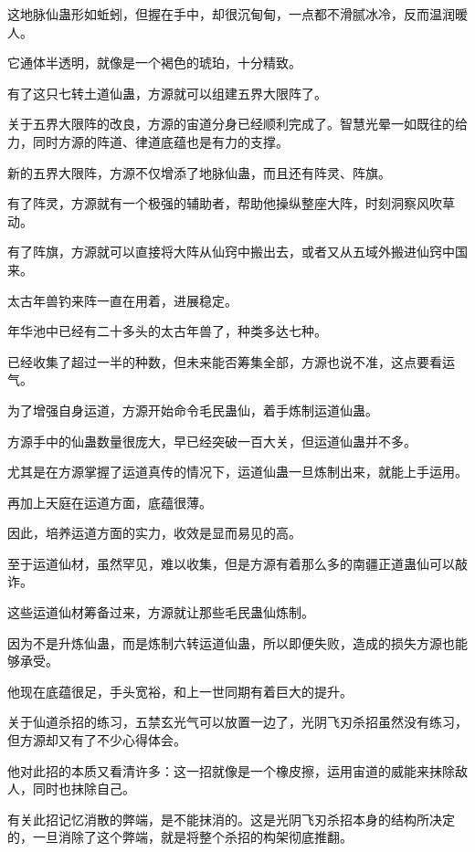 
\begin{this_body}

这地脉仙蛊形如蚯蚓，但握在手中，却很沉甸甸，一点都不滑腻冰冷，反而温润暖人。

它通体半透明，就像是一个褐色的琥珀，十分精致。

有了这只七转土道仙蛊，方源就可以组建五界大限阵了。

关于五界大限阵的改良，方源的宙道分身已经顺利完成了。智慧光晕一如既往的给力，同时方源的阵道、律道底蕴也是有力的支撑。

新的五界大限阵，方源不仅增添了地脉仙蛊，而且还有阵灵、阵旗。

有了阵灵，方源就有一个极强的辅助者，帮助他操纵整座大阵，时刻洞察风吹草动。

有了阵旗，方源就可以直接将大阵从仙窍中搬出去，或者又从五域外搬进仙窍中国来。

太古年兽钓来阵一直在用着，进展稳定。

年华池中已经有二十多头的太古年兽了，种类多达七种。

已经收集了超过一半的种数，但未来能否筹集全部，方源也说不准，这点要看运气。

为了增强自身运道，方源开始命令毛民蛊仙，着手炼制运道仙蛊。

方源手中的仙蛊数量很庞大，早已经突破一百大关，但运道仙蛊并不多。

尤其是在方源掌握了运道真传的情况下，运道仙蛊一旦炼制出来，就能上手运用。

再加上天庭在运道方面，底蕴很薄。

因此，培养运道方面的实力，收效是显而易见的高。

至于运道仙材，虽然罕见，难以收集，但是方源有着那么多的南疆正道蛊仙可以敲诈。

这些运道仙材筹备过来，方源就让那些毛民蛊仙炼制。

因为不是升炼仙蛊，而是炼制六转运道仙蛊，所以即便失败，造成的损失方源也能够承受。

他现在底蕴很足，手头宽裕，和上一世同期有着巨大的提升。

关于仙道杀招的练习，五禁玄光气可以放置一边了，光阴飞刃杀招虽然没有练习，但方源却又有了不少心得体会。

他对此招的本质又看清许多：这一招就像是一个橡皮擦，运用宙道的威能来抹除敌人，同时也抹除自己。

有关此招记忆消散的弊端，是不能抹消的。这是光阴飞刃杀招本身的结构所决定的，一旦消除了这个弊端，就是将整个杀招的构架彻底推翻。


\end{this_body}
